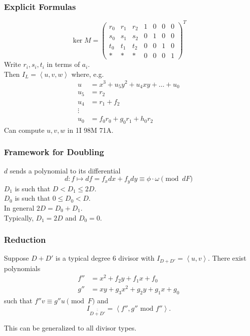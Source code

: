 \documentclass{beamer}
\newcommand{\pid}[1]{\left\langle #1 \right\rangle}
\DeclareMathOperator{\im}{im}
\renewcommand{\bar}{\overline}
\begin{document}

\begin{frame}
\frametitle{Explicit Formulas}
  \[ \ker M = \begin{pmatrix}
    r_0 & r_1 & r_2 & 1 & 0 & 0 & 0 \\
    s_0 & s_1 & s_2 & 0 & 1 & 0 & 0 \\
    t_0 & t_1 & t_2 & 0 & 0 & 1 & 0 \\
      * &   * &   * & 0 & 0 & 0 & 1
  \end{pmatrix}^T \]
  Write $r_i, s_i, t_i$ in terms of $a_i$. \\
  Then $I_L = \pid{u, v, w}$ where, e.g.
  \begin{align*}
    u &= x^3 + u_5y^2 + u_4xy + \dots + u_0 \\
    u_5 &= r_2 \\
    u_4 &= r_1 + f_2 \\
    \vdots \\
    u_0 &= f_0r_0 + g_0r_1 + h_0r_2
  \end{align*}
  Can compute $u, v, w$ in 1I 98M 71A.
\end{frame}


\begin{frame}[fragile]
\frametitle{Framework for Doubling}
  \begin{center}
  \end{center}
  $d$ sends a polynomial to its differential
  \[ d : f \mapsto df = f_xdx + f_ydy \equiv \phi \cdot \omega \pmod{dF} \]
  $D_1$ is such that $D < D_1 \leq 2D$. \\
  $D_0$ is such that $0 \leq D_0 < D$. \\
  In general $2D = D_0 + D_1$. \\
  Typically, $D_1 = 2D$ and $D_0 = 0$.
\end{frame}


\begin{frame}
\frametitle{Reduction}
  \begin{theorem}
    Suppose $D + D'$ is a typical degree 6 divisor with $I_{D + D'} = \pid{u,v}$.
    There exist polynomials
    \begin{align*}
      f'' &= x^2 + f_2y + f_1x + f_0 \\
      g'' &= xy + g_3x^2 + g_2y + g_1x + g_0
    \end{align*}
    such that $f''v \equiv g''u \pmod F$ and
    \[ I_{\bar{\bar{D + D'}}} = \pid{f'', g'' \text{ mod } f''}. \]
  \end{theorem}
  This can be generalized to all divisor types.
\end{frame}
\end{document}
